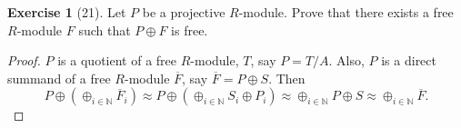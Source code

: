 \documentclass[reqno]{amsart}
\theoremstyle{definition}
\newtheorem{exercise}[theorem]{Exercise}
\theoremstyle{remark}
\begin{document}
    \begin{exercise}[21]
        Let $P$ be a projective $R$-module. Prove
        that there exists a free $R$-module $F$ such that
        $P \oplus F$ is free.
    \end{exercise}

    \begin{proof}
        $P$ is a quotient of a 
        free $R$-module, $T$, say
        $P = T /A$. Also, $P$ is a direct summand of
        a free $R$-module $\overline{F}$, say
        $\overline{F} = P \oplus S$.
        Then
        \[
        P \oplus \left( \oplus_{i \in \mathbb{N} }
        \overline{F}_i \right)
        \approx
        P \oplus \left( \oplus_{i \in \mathbb{N} }
        S_i \oplus P_i\right) 
        \approx
        \oplus_{i \in \mathbb{N} }
        P \oplus S
        \approx \oplus_{i \in \mathbb{N} }\overline{F}.
        \] 
    \end{proof}

















\end{document}
